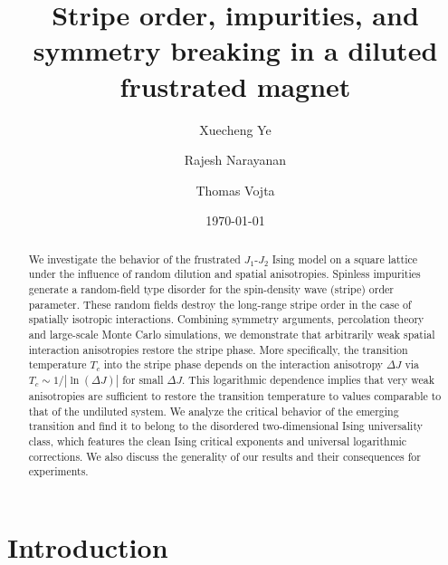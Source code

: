 \documentclass[twocolumn,showpacs,superscriptaddress,aps,prb]{revtex4-2}
\begin{document}
\title{Stripe order, impurities, and symmetry breaking in a diluted frustrated magnet}
\author{Xuecheng Ye}
\author{Rajesh Narayanan}
\author{Thomas Vojta}

\begin{abstract}
We investigate the behavior of the frustrated $J_1$-$J_2$ Ising model on a square lattice
under the influence of random dilution and spatial anisotropies. Spinless impurities generate
a random-field type disorder for the spin-density wave (stripe) order parameter. These random
fields destroy the long-range stripe order in the case of spatially isotropic interactions.
Combining symmetry arguments, percolation theory and large-scale Monte Carlo simulations,
we demonstrate that arbitrarily weak spatial interaction anisotropies restore the stripe phase.
More specifically, the transition temperature $T_c$ into the stripe phase depends
on the interaction anisotropy $\Delta J$ via $T_c \sim 1/|\ln (\Delta J)|$ for small $\Delta J$.
This logarithmic dependence implies that very weak anisotropies are sufficient to restore the
transition temperature
to values comparable to that of the undiluted system. We analyze the critical
behavior of the emerging transition and find it to belong to the disordered two-dimensional Ising
universality class, which features the clean Ising critical exponents and universal logarithmic
corrections. We also discuss the generality of our results and their consequences for experiments.
\end{abstract}

\date{\today}

\maketitle



\section{Introduction}
\label{sec:intro}
\end{document}

